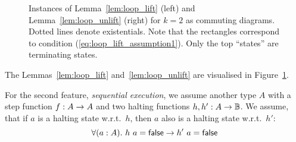 \begin{figure}
  \center
  \hspace{1cm}
  \caption{Instances of Lemma~\ref{lem:loop_lift} (left) and Lemma~\ref{lem:loop_unlift} (right) for $k=2$ as commuting diagrams.  Dotted lines denote
    existentials.  Note that the rectangles correspond to condition (\ref{eq:loop_lift_assumption1}).  Only the top ``states'' are terminating
    states.}
  \label{fig:loop_lift_lemmas}
\end{figure}

The Lemmas~\ref{lem:loop_lift} and~\ref{lem:loop_unlift} are visualised in Figure~\ref{fig:loop_lift_lemmas}.

For the second feature, \textit{sequential execution}, we assume another type $A$ with a step function $f : A \rightarrow A$ and two halting functions
$h, h' : A \rightarrow \mathbb{B}$.  We assume, that if $a$ is a halting state w.r.t.\ $h$, then $a$ also is a halting state w.r.t.\ $h'$:
\begin{equation}
  \label{eq:loop_merge_assumption}
  \forall(a:A).~h~a = \mathsf{false} \rightarrow h'~a = \mathsf{false}
\end{equation}

